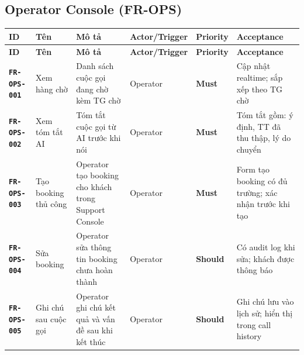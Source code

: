 \documentclass[12pt,a4paper]{article}
\newcommand{\reqid}[1]{\texttt{\textbf{\color{AloBlue}#1}}}
\newcommand{\musthave}{\colorbox{PrioMust}{\small\textbf{Must}}}
\newcommand{\shouldhave}{\colorbox{PrioShould}{\small\textbf{Should}}}
\begin{document}
\subsection{Operator Console (FR-OPS)}
\begin{longtable}{L{2.2cm} L{2.2cm} L{3.8cm} L{2.8cm} C{1.5cm} L{3cm}}
  \toprule{}\textbf{ID}&\textbf{Tên}&\textbf{Mô tả}&\textbf{Actor/Trigger}&\textbf{Priority}&\textbf{Acceptance}\\
  \midrule\endfirsthead\toprule{}\textbf{ID}&\textbf{Tên}&\textbf{Mô tả}&\textbf{Actor/Trigger}&\textbf{Priority}&\textbf{Acceptance}\\\midrule\endhead\bottomrule\endlastfoot
  \reqid{FR-OPS-001} & Xem hàng chờ & Danh sách cuộc gọi đang chờ kèm TG chờ & Operator & \musthave & Cập nhật realtime; sắp xếp theo TG chờ \\
  \reqid{FR-OPS-002} & Xem tóm tắt AI & Tóm tắt cuộc gọi từ AI trước khi nói & Operator & \musthave & Tóm tắt gồm: ý định, TT đã thu thập, lý do chuyển \\
  \reqid{FR-OPS-003} & Tạo booking thủ công & Operator tạo booking cho khách trong Support Console & Operator & \musthave & Form tạo booking có đủ trường; xác nhận trước khi tạo \\
  \reqid{FR-OPS-004} & Sửa booking & Operator sửa thông tin booking chưa hoàn thành & Operator & \shouldhave & Có audit log khi sửa; khách được thông báo \\
  \reqid{FR-OPS-005} & Ghi chú sau cuộc gọi & Operator ghi chú kết quả và vấn đề sau khi kết thúc & Operator & \shouldhave & Ghi chú lưu vào lịch sử; hiển thị trong call history \\
\end{longtable}
\end{document}
